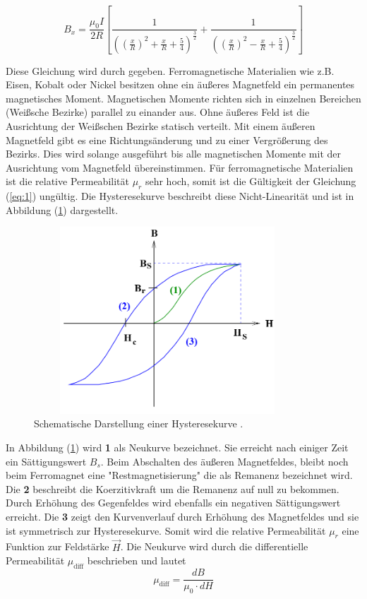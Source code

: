 \begin{equation}
  B_x = \frac{\mu_0 I}{2R} \left[ \frac{1}{\left(\left(\frac{x}{R}\right)^2 + \frac{x}{R} + \frac{5}{4} \right)^{\frac{3}{2}}}
  + \frac{1}{\left(\left(\frac{x}{R}\right)^2 - \frac{x}{R} + \frac{5}{4} \right)^{\frac{3}{2}}}\right]
  \label{eq:8}
\end{equation}

Diese Gleichung wird durch \cite{3} gegeben.
Ferromagnetische Materialien wie z.B. Eisen, Kobalt oder Nickel besitzen ohne ein äußeres Magnetfeld
ein permanentes magnetisches Moment. Magnetischen Momente richten sich in einzelnen Bereichen (Weißsche Bezirke)
parallel zu einander aus. Ohne äußeres Feld ist die Ausrichtung der Weißschen Bezirke statisch verteilt.
Mit einem äußeren Magnetfeld gibt es eine Richtungsänderung und zu einer Vergrößerung des Bezirks.
Dies wird solange ausgeführt bis alle magnetischen Momente mit der Ausrichtung vom Magnetfeld übereinstimmen.
Für ferromagnetische Materialien ist die relative Permeabilität $\mu_r$ sehr hoch, somit ist die Gültigkeit der
Gleichung (\ref{eq:1}) ungültig.
Die Hysteresekurve beschreibt diese Nicht-Linearität und ist in Abbildung (\ref{abb:3}) dargestellt.
\begin{figure}[H]
  \centering
  \includegraphics[width=10cm, height= 7cm]{Abb3.png}
  \caption{Schematische Darstellung einer Hysteresekurve \cite{1}.}
  \label{abb:3}
\end{figure}
In Abbildung (\ref{abb:3}) wird \textbf{1} als Neukurve bezeichnet.
Sie erreicht nach einiger Zeit ein Sättigungswert $B_s$. Beim Abschalten
des äußeren Magnetfeldes, bleibt noch beim Ferromagnet eine "Restmagnetisierung" die
als Remanenz bezeichnet wird. Die \textbf{2} beschreibt die Koerzitivkraft um die Remanenz auf null zu bekommen.
Durch Erhöhung des Gegenfeldes wird ebenfalls ein negativen Sättigungswert erreicht.
Die \textbf{3} zeigt den Kurvenverlauf durch Erhöhung des Magnetfeldes und sie ist symmetrisch zur Hysteresekurve.
Somit wird die relative Permeabilität $\mu_r$ eine Funktion zur Feldstärke $\vec{H}$.
Die Neukurve wird durch die differentielle Permeabilität $\mu_\text{diff}$ beschrieben und lautet
\begin{equation*}
  \mu_\text{diff} = \frac{dB}{\mu_0 \cdot dH}
  \label{eq:6}
\end{equation*}
